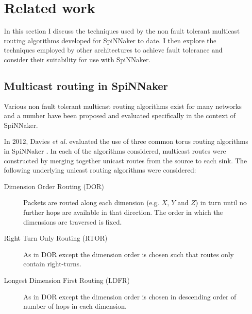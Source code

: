 	\section{Related work}
		
		In this section I discuss the techniques used by the non fault tolerant
		multicast routing algorithms developed for SpiNNaker to date. I then
		explore the techniques employed by other architectures to achieve fault
		tolerance and consider their suitability for use with SpiNNaker.
		
		\subsection{Multicast routing in SpiNNaker}
			
			Various non fault tolerant multicast routing algorithms exist for many
			networks and a number have been proposed and evaluated specifically in the
			context of SpiNNaker.
			
			In 2012, Davies \emph{et al.} evaluated the use of three common torus
			routing algorithms in SpiNNaker \cite{davies12}. In each of the
			algorithms considered, multicast routes were constructed by merging
			together unicast routes from the source to each sink. The following
			underlying unicast routing algorithms were considered:
			
			\begin{description}
				
				\item[Dimension Order Routing (DOR)] Packets are routed along each
				dimension (e.g. $X$, $Y$ and $Z$) in turn until no further hops are
				available in that direction.  The order in which the dimensions are
				traversed is fixed.
				
				\item[Right Turn Only Routing (RTOR)] As in DOR except the dimension
				order is chosen such that routes only contain right-turns.
				
				\item[Longest Dimension First Routing (LDFR)] As in DOR except the
				dimension order is chosen in descending order of number of hops in each
				dimension.
				
			\end{description}
			
